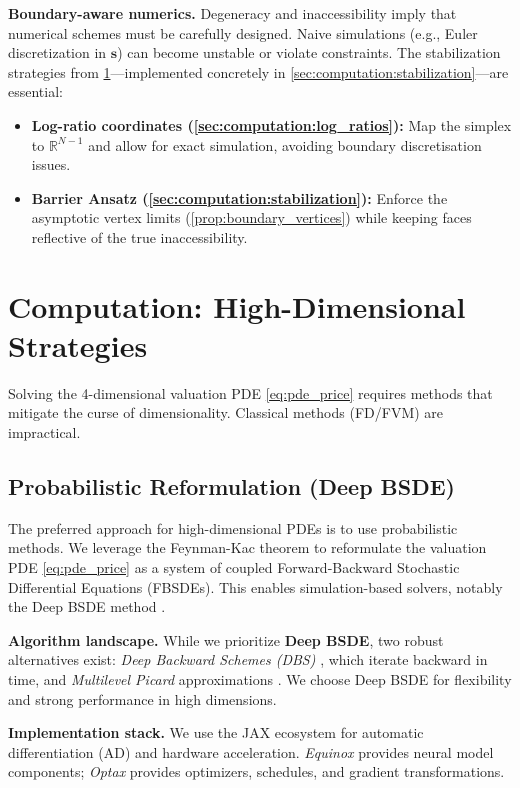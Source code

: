 \documentclass[11pt,letterpaper,oneside]{article}
\numberwithin{equation}{section}
\newcommand{\1}{\mathbf{1}}
\begin{document}
\begin{tcolorbox}[didacticstyle]
\begin{tcolorbox}[didacticstyle,title={Computational implications for Deep BSDE solvers}]
  	\textbf{Boundary-aware numerics.} Degeneracy and inaccessibility imply that numerical schemes must be carefully designed. Naive simulations (e.g., Euler discretization in $\bm{s}$) can become unstable or violate constraints. The stabilization strategies from \cref{sec:computation}—implemented concretely in \cref{sec:computation:stabilization}—are essential:
    \begin{itemize}[leftmargin=1.25em]
        \item \textbf{Log-ratio coordinates (\cref{sec:computation:log_ratios}):} Map the simplex to $\mathbb{R}^{N-1}$ and allow for exact simulation, avoiding boundary discretisation issues.
        \item \textbf{Barrier Ansatz (\cref{sec:computation:stabilization}):} Enforce the asymptotic vertex limits (\cref{prop:boundary_vertices}) while keeping faces reflective of the true inaccessibility.
    \end{itemize}
\end{tcolorbox}
\end{tcolorbox}

\section{Computation: High-Dimensional Strategies}\label{sec:computation}
Solving the 4-dimensional valuation PDE \eqref{eq:pde_price} requires methods that mitigate the curse of dimensionality. Classical methods (FD/FVM) are impractical.

\subsection{Probabilistic Reformulation (Deep BSDE)}\label{sec:computation:deepbsde}

The preferred approach for high-dimensional PDEs is to use probabilistic methods. We leverage the Feynman-Kac theorem to reformulate the valuation PDE \eqref{eq:pde_price} as a system of coupled Forward-Backward Stochastic Differential Equations (FBSDEs). This enables simulation-based solvers, notably the Deep BSDE method \cite{han2018solving,huang2025probabilistic}.

\begin{tcolorbox}[didacticstyle,title={Algorithmic Choices and Implementation Stack}]
	\textbf{Algorithm landscape.} While we prioritize \textbf{Deep BSDE}, two robust alternatives exist: \emph{Deep Backward Schemes (DBS)} \cite{hure2020deep}, which iterate backward in time, and \emph{Multilevel Picard} approximations \cite{hutzenthaler2024multilevel}. We choose Deep BSDE for flexibility and strong performance in high dimensions.

	\textbf{Implementation stack.} We use the JAX ecosystem for automatic differentiation (AD) and hardware acceleration. \emph{Equinox} provides neural model components; \emph{Optax} provides optimizers, schedules, and gradient transformations.
\end{tcolorbox}
\end{document}
